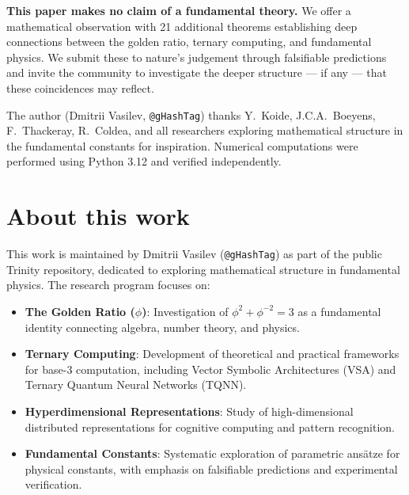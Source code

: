 \documentclass[aps,prd,preprint,superscriptaddress,showpacs,nofootinbib,longbibliography]{revtex4-2}
\begin{document}
\textbf{This paper makes no claim of a fundamental theory.} We offer a mathematical observation with 21 additional theorems establishing deep connections between the golden ratio, ternary computing, and fundamental physics. We submit these to nature's judgement through falsifiable predictions and invite the community to investigate the deeper structure --- if any --- that these coincidences may reflect.

\begin{acknowledgments}
The author (Dmitrii Vasilev, \texttt{@gHashTag}) thanks Y.~Koide, J.C.A.~Boeyens, F.~Thackeray, R.~Coldea, and all researchers exploring mathematical structure in the fundamental constants for inspiration. Numerical computations were performed using Python 3.12 and verified independently.
\end{acknowledgments}

\section*{About this work}
\label{sec:foundation}

This work is maintained by Dmitrii Vasilev (\texttt{@gHashTag}) as part of the public Trinity repository, dedicated to exploring mathematical structure in fundamental physics. The research program focuses on:

\begin{itemize}[itemsep=2pt]
    \item \textbf{The Golden Ratio ($\phi$)}: Investigation of $\phi^2 + \phi^{-2} = 3$ as a fundamental identity connecting algebra, number theory, and physics.

    \item \textbf{Ternary Computing}: Development of theoretical and practical frameworks for base-3 computation, including Vector Symbolic Architectures (VSA) and Ternary Quantum Neural Networks (TQNN).

    \item \textbf{Hyperdimensional Representations}: Study of high-dimensional distributed representations for cognitive computing and pattern recognition.

    \item \textbf{Fundamental Constants}: Systematic exploration of parametric ansätze for physical constants, with emphasis on falsifiable predictions and experimental verification.
\end{itemize}
\end{document}

